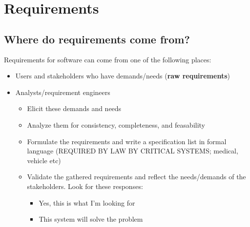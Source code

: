 \documentclass[12pt]{book}
\begin{document}
\section*{Requirements}
\subsection*{Where do requirements come from?}
Requirements for software can come from one of the following places:
\begin{itemize}
  \item Users and stakeholders who have demands/needs (\textbf{raw requirements})
  \item Analysts/requirement engineers
  \begin{itemize}
    \item Elicit these demands and needs
    \item Analyze them for consistency, completeness, and feasability
    \item Formulate the requirements and write a specification list in formal language (REQUIRED BY LAW BY CRITICAL SYSTEMS; medical, vehicle etc)
    \item Validate the gathered requirements and reflect the needs/demands of the stakeholders. Look for these responses:
    \begin{itemize}
      \item Yes, this is what I'm looking for
      \item This system will solve the problem
    \end{itemize} 
  \end{itemize}
\end{itemize}
\end{document}
